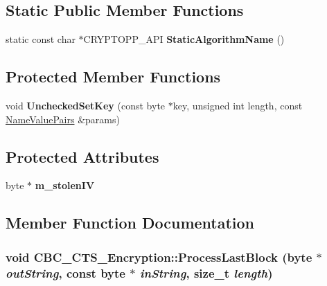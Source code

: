 \subsection*{Static Public Member Functions}
\begin{DoxyCompactItemize}
\item 
\hypertarget{class_c_b_c___c_t_s___encryption_a31660b9fdce16b82c15e87697fef5595}{
static const char $\ast$CRYPTOPP\_\-API {\bfseries StaticAlgorithmName} ()}
\label{class_c_b_c___c_t_s___encryption_a31660b9fdce16b82c15e87697fef5595}

\end{DoxyCompactItemize}
\subsection*{Protected Member Functions}
\begin{DoxyCompactItemize}
\item 
\hypertarget{class_c_b_c___c_t_s___encryption_ae4bbc33978a096b417810ae266d5ed01}{
void {\bfseries UncheckedSetKey} (const byte $\ast$key, unsigned int length, const \hyperlink{class_name_value_pairs}{NameValuePairs} \&params)}
\label{class_c_b_c___c_t_s___encryption_ae4bbc33978a096b417810ae266d5ed01}

\end{DoxyCompactItemize}
\subsection*{Protected Attributes}
\begin{DoxyCompactItemize}
\item 
\hypertarget{class_c_b_c___c_t_s___encryption_a1e5e3194957afd90092b1f49257374d3}{
byte $\ast$ {\bfseries m\_\-stolenIV}}
\label{class_c_b_c___c_t_s___encryption_a1e5e3194957afd90092b1f49257374d3}

\end{DoxyCompactItemize}


\subsection{Member Function Documentation}
\hypertarget{class_c_b_c___c_t_s___encryption_afa5e227b89c39bff1386df7cebaa5f32}{
\subsubsection[{ProcessLastBlock}]{\setlength{\rightskip}{0pt plus 5cm}void CBC\_\-CTS\_\-Encryption::ProcessLastBlock (byte $\ast$ {\em outString}, \/  const byte $\ast$ {\em inString}, \/  size\_\-t {\em length})}}
\label{class_c_b_c___c_t_s___encryption_afa5e227b89c39bff1386df7cebaa5f32}



